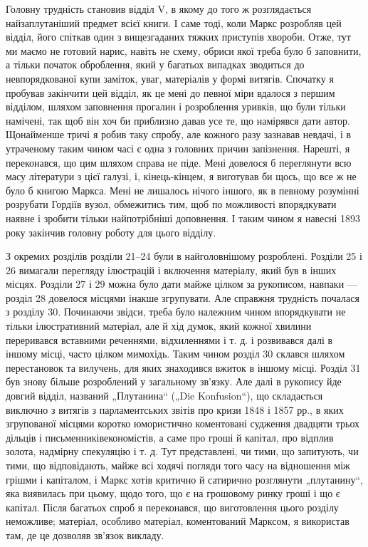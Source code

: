 
Головну трудність становив відділ V, в якому до того ж
розглядається найзаплутаніший предмет всієї книги. І саме тоді,
коли Маркс розробляв цей відділ, його спіткав один з вищезгаданих
тяжких приступів хвороби. Отже, тут ми маємо не готовий
нарис, навіть не схему, обриси якої треба було б заповнити,
а тільки початок оброблення, який у багатьох випадках зводиться
до невпорядкованої купи заміток, уваг, матеріалів у формі
витягів. Спочатку я пробував закінчити цей відділ, як це мені
до певної міри вдалося з першим відділом, шляхом заповнення
прогалин і розроблення уривків, що були тільки намічені, так щоб
він хоч би приблизно давав усе те, що намірявся дати автор. Щонайменше
тричі я робив таку спробу, але кожного разу зазнавав
невдачі, і в утраченому таким чином часі є одна з головних причин
запізнення. Нарешті, я переконався, що цим шляхом справа
не піде. Мені довелося б переглянути всю масу літератури з цієї
галузі, і, кінець-кінцем, я виготував би щось, що все ж не було б
книгою Маркса. Мені не лишалось нічого іншого, як в певному
розумінні розрубати Гордіїв вузол, обмежитись тим, щоб по
можливості впорядкувати наявне і зробити тільки найпотрібніші
доповнення. І таким чином я навесні 1893 року закінчив головну
роботу для цього відділу.

З окремих розділів розділи 21--24 були в найголовнішому
розроблені. Розділи 25 і 26 вимагали перегляду ілюстрацій і
включення матеріалу, який був в інших місцях. Розділи 27 і 29 можна
було дати майже цілком за рукописом, навпаки — розділ 28 довелося
місцями інакше згрупувати. Але справжня трудність почалася
з розділу 30. Починаючи звідси, треба було належним чином
впорядкувати не тільки ілюстративний матеріал, але й хід думок,
який кожної хвилини переривався вставними реченнями, відхиленнями
і т. д. і розвивався далі в іншому місці, часто цілком мимохідь.
Таким чином розділ 30 склався шляхом перестановок та вилучень,
для яких знаходився вжиток в іншому місці. Розділ 31 був знову
більше розроблений у загальному зв’язку. Але далі в рукопису
йде довгий відділ, названий „Плутанина“ („Die Konfusion“), що
складається виключно з витягів з парламентських звітів про кризи
1848 і 1857 рр., в яких згрупованої місцями коротко юмористично
коментовані судження двадцяти трьох дільців і письменниківекономістів,
а саме про гроші й капітал, про відплив золота, надмірну
спекуляцію і т. д. Тут представлені, чи тими, що запитують,
чи тими, що відповідають, майже всі ходячі погляди того
часу на відношення між грішми і капіталом, і Маркс хотів критично
й сатирично розглянути „плутанину“, яка виявилась при цьому,
щодо того, що є на грошовому ринку гроші і що є капітал.
Після багатьох спроб я переконався, що виготовлення цього
розділу неможливе; матеріал, особливо матеріал, коментований
Марксом, я використав там, де це дозволяв зв’язок викладу.

